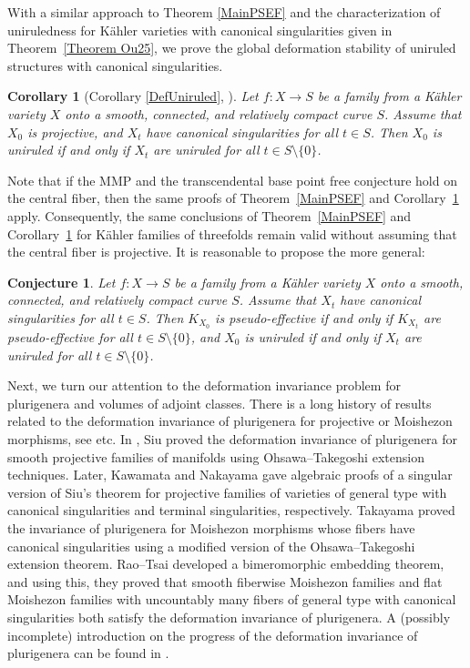 \documentclass[12pt]{amsart}
\numberwithin{equation}{section}
\newtheorem{corollary}  [theorem]     {Corollary}
\theoremstyle{definition}
\theoremstyle{plain}
\newtheorem{conjecture}  [theorem]     {Conjecture}
\newtheorem*{thm A*}{Theorem A}
\newtheorem*{thm B*}{Theorem B}
\newtheorem*{thm C*}{Theorem C}
\newtheorem*{thm D*}{Theorem D}
\theoremstyle{definition}
\renewcommand{\1}{\mathds{1}}
\renewcommand{\>}{\rightarrow}
\begin{document}
With a similar approach to Theorem \ref{MainPSEF} and the characterization of uniruledness for K\"ahler varieties with canonical singularities given in Theorem~\ref{Theorem Ou25}, we prove the global deformation stability of uniruled structures with canonical singularities.
\begin{corollary}[Corollary \ref{DefUniruled}, \cite{DefGeneralType}]\label{MainDefUniruled}
Let $f: X \to S$ be a family from a K\"ahler variety $X$ onto a smooth, connected, and relatively compact curve $S$. Assume that $X_0$ is projective, and $X_t$ have canonical singularities for all $t\in S$. Then $X_0$ is uniruled if and only if $X_t$ are uniruled for all $t \in S \setminus \{0\}$.
\end{corollary}

Note that if the MMP and the transcendental base point free conjecture hold on the central fiber, then the same proofs of Theorem~\ref{MainPSEF} and Corollary~\ref{MainDefUniruled} apply. Consequently, the same conclusions of Theorem~\ref{MainPSEF} and Corollary~\ref{MainDefUniruled} for K\"ahler families of threefolds remain valid without assuming that the central fiber is projective.
It is reasonable to propose the more general:
\begin{conjecture}Let $f: X \to S$ be a family from a K\"ahler variety $X$ onto a smooth, connected, and relatively compact curve $S$. Assume that $X_t$ have canonical singularities for all $t\in S$. Then $K_{X_0}$ is pseudo-effective if and only if $K_{X_t} $ are pseudo-effective for all $t \in S \setminus \{0\}$, and $X_0$ is uniruled if and only if $X_t$ are uniruled for all $t \in S \setminus \{0\}$.
\end{conjecture}


Next, we turn our attention to the deformation invariance problem for plurigenera and volumes of adjoint classes. There is a long history of results related to the deformation invariance of plurigenera for projective or Moishezon morphisms, see \cite{Siu98,Kawamata99,Kawa99,Siu02,Tsuji02,Naka04,Taka06,Paun07,BP12,HMX13,FS20,RT1,RT2,LW26} etc. In \cite{Siu98,Siu02}, Siu proved the deformation invariance of plurigenera for smooth projective families of manifolds using Ohsawa--Takegoshi extension techniques. 
Later, Kawamata \cite{Kawa99} and Nakayama \cite{Naka04} gave algebraic proofs of a singular version of Siu's theorem for projective families of varieties of general type with canonical singularities and terminal singularities, respectively. 
Takayama \cite{Taka06} proved the invariance of plurigenera for Moishezon morphisms whose fibers have canonical singularities using a modified version of the Ohsawa--Takegoshi extension theorem. Rao--Tsai \cite{RT1,RT2} developed a bimeromorphic embedding theorem, and using this, they proved that smooth fiberwise Moishezon families and flat Moishezon families with uncountably many fibers of general type with canonical singularities both satisfy the deformation invariance of plurigenera. A  (possibly incomplete) introduction on the progress of the deformation invariance of plurigenera can be found in \cite[Introduction]{RT2}.
\end{document}
